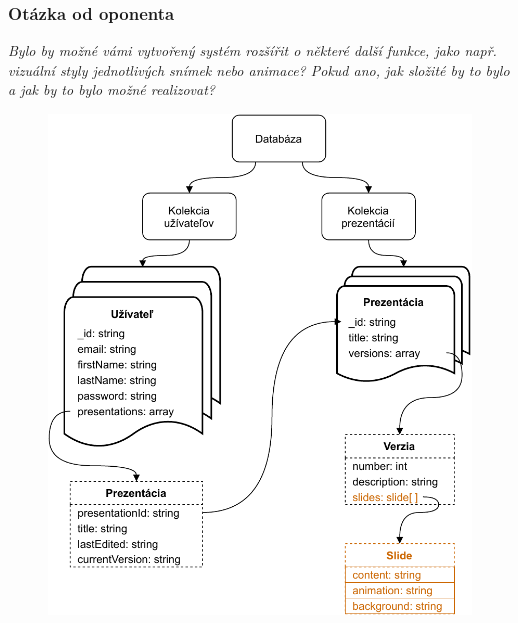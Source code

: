 \documentclass[10pt,xcolor=pdflatex,hyperref={unicode}]{beamer}
\begin{document}

\begin{frame}\frametitle{Otázka od oponenta}
    \emph{    Bylo by možné vámi vytvořený systém rozšířit o některé další funkce, jako např. vizuální styly jednotlivých snímek nebo animace? Pokud ano, jak složité by to bylo a jak by to bylo možné realizovat?}
    
    \begin{figure}[!hbt]
        \centering
        \includegraphics[scale=0.4]{img/databaza-1.pdf}
    \end{figure}
\end{frame}
\end{document}
